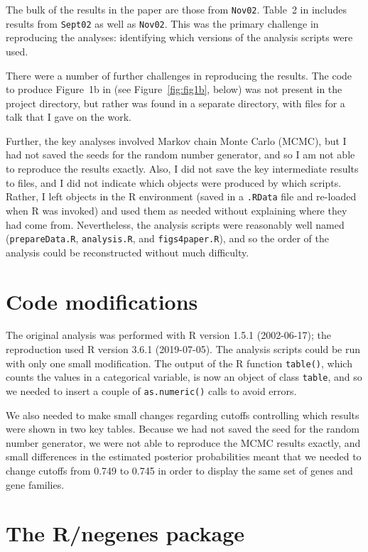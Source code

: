 The bulk of the results in the paper are those from {\tt Nov02}.
Table~2 in \citet{lamichhane2003} includes results from {\tt Sept02}
as well as {\tt Nov02}. This was the primary challenge in reproducing
the analyses: identifying which versions of the analysis
scripts were used.

There were a number of further challenges in reproducing the results.
The code to produce Figure~1b in \citet{lamichhane2003} (see
Figure~\ref{fig:fig1b}, below) was not
present in the project directory, but rather was found in a separate
directory, with files for a talk that I gave on the work.

Further, the key analyses involved Markov chain Monte Carlo (MCMC),
but I had not saved the seeds for the random number generator, and so
I am not able to reproduce the results exactly. Also, I did not save
the key intermediate results to files, and I did not indicate which
objects were produced by which scripts. Rather, I left objects in the
R environment (saved in a {\tt .RData} file and re-loaded when R was
invoked) and used them as needed without explaining where they had
come from. Nevertheless, the analysis scripts were reasonably well
named ({\tt prepareData.R}, {\tt analysis.R},
and {\tt figs4paper.R}), and so the order of the analysis could be
reconstructed without much difficulty.

\section{Code modifications}

The original analysis was performed with R version 1.5.1 (2002-06-17);
the reproduction used R version 3.6.1 (2019-07-05). The analysis
scripts could be run with only one small modification. The output of
the R function {\tt table()}, which counts the values in a
categorical variable, is now an object of class {\tt table}, and so
we needed to insert a couple of {\tt as.numeric()} calls to avoid
errors.

We also needed to make small changes regarding cutoffs controlling which results
were shown in two key tables. Because we had not saved the seed for
the random number generator, we were not able to reproduce the MCMC
results exactly, and small differences in the estimated posterior
probabilities meant that we needed to change cutoffs from 0.749 to
0.745 in order to display the same set of genes and gene families.




\section{The R/negenes package}

